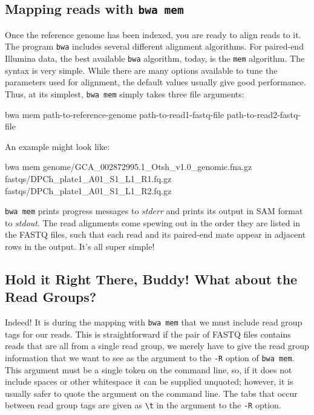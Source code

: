 \documentclass[]{krantz}
\makeatletter
\newenvironment{Shaded}{\begin{snugshade}}{\end{snugshade}}
\newcommand{\ExtensionTok}[1]{#1}
\newcommand{\NormalTok}[1]{#1}
\newenvironment{kframe}{%
\medskip{}
\setlength{\fboxsep}{.8em}
 \def\at@end@of@kframe{}%
 \ifinner\ifhmode%
  \def\at@end@of@kframe{\end{minipage}}%
  \begin{minipage}{\columnwidth}%
 \fi\fi%
 \def\FrameCommand##1{\hskip\@totalleftmargin \hskip-\fboxsep
 \colorbox{shadecolor}{##1}\hskip-\fboxsep
     \hskip-\linewidth \hskip-\@totalleftmargin \hskip\columnwidth}%
 \MakeFramed {\advance\hsize-\width
   \@totalleftmargin\z@ \linewidth\hsize
   \@setminipage}}%
 {\par\unskip\endMakeFramed%
 \at@end@of@kframe}
\renewenvironment{Shaded}{\begin{kframe}}{\end{kframe}}
\makeatother
\begin{document}
\hypertarget{mapping-reads-with-bwa-mem}{%
\subsection{\texorpdfstring{Mapping reads with \texttt{bwa\ mem}}{Mapping reads with bwa mem}}\label{mapping-reads-with-bwa-mem}}

Once the reference genome has been indexed, you are ready to align reads to
it. The program \texttt{bwa} includes several different alignment algorithms. For paired-end Illumina data,
the best available \texttt{bwa} algorithm, today, is the \texttt{mem} algorithm. The syntax is very simple. While there
are many options available to tune the parameters used for alignment, the default values
usually give good performance. Thus, at its
simplest, \texttt{bwa\ mem} simply takes three file arguments:

\begin{Shaded}
\begin{Highlighting}[]
\ExtensionTok{bwa}\NormalTok{ mem   path-to-reference-genome   path-to-read1-fastq-file   path-to-read2-fastq-file}
\end{Highlighting}
\end{Shaded}

An example might look like:

\begin{Shaded}
\begin{Highlighting}[]
\ExtensionTok{bwa}\NormalTok{ mem genome/GCA_002872995.1_Otsh_v1.0_genomic.fna.gz fastqs/DPCh_plate1_A01_S1_L1_R1.fq.gz fastqs/DPCh_plate1_A01_S1_L1_R2.fq.gz}
\end{Highlighting}
\end{Shaded}

\texttt{bwa\ mem} prints progress messages to \emph{stderr} and prints its output in SAM format to \emph{stdout}. The read alignments
come spewing out in the order they are listed in the FASTQ files, such that each read and its
paired-end mate appear in adjacent rows in the output. It's all super simple!

\hypertarget{hold-it-right-there-buddy-what-about-the-read-groups}{%
\subsection{Hold it Right There, Buddy! What about the Read Groups?}\label{hold-it-right-there-buddy-what-about-the-read-groups}}

Indeed! It is during the mapping with \texttt{bwa\ mem} that we must include
read group tags for our reads. This is straightforward if the pair of
FASTQ files contains reads that are all from a single read group, we
merely have to give the read group information that we want to see as the
argument to the \texttt{-R} option of \texttt{bwa\ mem}. This argument must be a single
token on the command line, so, if it does not include spaces or other whitespace
it can be supplied unquoted; however, it is usually safer to quote the argument on
the command line. The tabs that occur between read group tags are given as \texttt{\textbackslash{}t}
in the argument to the \texttt{-R} option.
\end{document}
